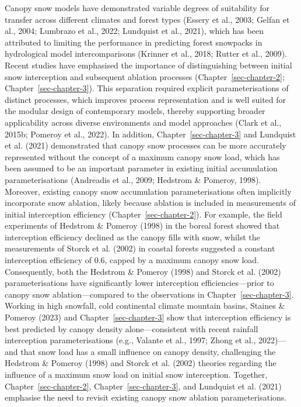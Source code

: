 \documentclass[
  letterpaper,
]{tex/uofsthesis-cs}
\begin{document}
Canopy snow models have demonstrated variable degrees of suitability for
transfer across different climates and forest types (Essery et al.,
2003; Gelfan et al., 2004; Lumbrazo et al., 2022; Lundquist et al.,
2021), which has been attributed to limiting the performance in
predicting forest snowpacks in hydrological model intercomparisons
(Krinner et al., 2018; Rutter et al., 2009). Recent studies have
emphasised the importance of distinguishing between initial snow
interception and subsequent ablation processes
(Chapter~\ref{sec-chapter-2}; Chapter~\ref{sec-chapter-3}). This
separation required explicit parameterisations of distinct processes,
which improves process representation and is well suited for the modular
design of contemporary models, thereby supporting broader applicability
across diverse environments and model approaches (Clark et al., 2015b;
Pomeroy et al., 2022). In addition, Chapter~\ref{sec-chapter-3} and
Lundquist et al. (2021) demonstrated that canopy snow processes can be
more accurately represented without the concept of a maximum canopy snow
load, which has been assumed to be an important parameter in existing
initial accumulation parameterisations (Andreadis et al., 2009; Hedstrom
\& Pomeroy, 1998). Moreover, existing canopy snow accumulation
parameterisations often implicitly incorporate snow ablation, likely
because ablation is included in measurements of initial interception
efficiency (Chapter~\ref{sec-chapter-2}). For example, the field
experiments of Hedstrom \& Pomeroy (1998) in the boreal forest showed
that interception efficiency declined as the canopy fills with snow,
whilst the measurements of Storck et al. (2002) in coastal forests
suggested a constant interception efficiency of 0.6, capped by a maximum
canopy snow load. Consequently, both the Hedstrom \& Pomeroy (1998) and
Storck et al. (2002) parameterisations have significantly lower
interception efficiencies---prior to canopy snow ablation---compared to
the observations in Chapter~\ref{sec-chapter-3}. Working in high
snowfall, cold continental climate mountain basins, Staines \& Pomeroy
(2023) and Chapter~\ref{sec-chapter-3} show that interception efficiency
is best predicted by canopy density alone---consistent with recent
rainfall interception parameterisations (e.g., Valante et al., 1997;
Zhong et al., 2022)---and that snow load has a small influence on canopy
density, challenging the Hedstrom \& Pomeroy (1998) and Storck et al.
(2002) theories regarding the influence of a maximum snow load on
initial snow interception. Together, Chapter~\ref{sec-chapter-2},
Chapter~\ref{sec-chapter-3}, and Lundquist et al. (2021) emphasise the
need to revisit existing canopy snow ablation parameterisations.
\end{document}
